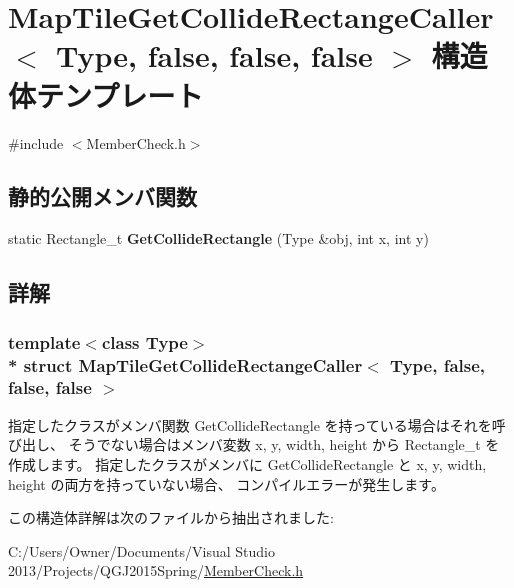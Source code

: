 \hypertarget{struct_map_tile_get_collide_rectange_caller_3_01_type_00_01false_00_01false_00_01false_01_4}{}\section{Map\+Tile\+Get\+Collide\+Rectange\+Caller$<$ Type, false, false, false $>$ 構造体テンプレート}
\label{struct_map_tile_get_collide_rectange_caller_3_01_type_00_01false_00_01false_00_01false_01_4}


 




{\ttfamily \#include $<$Member\+Check.\+h$>$}

\subsection*{静的公開メンバ関数}
\begin{DoxyCompactItemize}
\item 
static Rectangle\+\_\+t {\bfseries Get\+Collide\+Rectangle} (Type \&obj, int x, int y)\hypertarget{struct_map_tile_get_collide_rectange_caller_3_01_type_00_01false_00_01false_00_01false_01_4_aef0ce1de7885940c5fc7400060b3b0eb}{}\label{struct_map_tile_get_collide_rectange_caller_3_01_type_00_01false_00_01false_00_01false_01_4_aef0ce1de7885940c5fc7400060b3b0eb}

\end{DoxyCompactItemize}


\subsection{詳解}
\subsubsection*{template$<$class Type$>$\\*
struct Map\+Tile\+Get\+Collide\+Rectange\+Caller$<$ Type, false, false, false $>$}



指定したクラスがメンバ関数 Get\+Collide\+Rectangle を持っている場合はそれを呼び出し、 そうでない場合はメンバ変数 x, y, width, height から Rectangle\+\_\+t を作成します。 指定したクラスがメンバに Get\+Collide\+Rectangle と x, y, width, height の両方を持っていない場合、 コンパイルエラーが発生します。 

この構造体詳解は次のファイルから抽出されました\+:\begin{DoxyCompactItemize}
\item 
C\+:/\+Users/\+Owner/\+Documents/\+Visual Studio 2013/\+Projects/\+Q\+G\+J2015\+Spring/\hyperlink{_member_check_8h}{Member\+Check.\+h}\end{DoxyCompactItemize}
